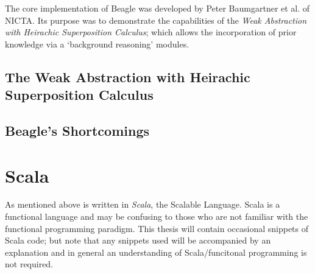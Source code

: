 The core implementation of Beagle was developed by Peter Baumgartner et al. of NICTA.
Its purpose was to demonstrate the capabilities of the \emph{Weak Abstraction with Heirachic Superposition Calculus};
which allows the incorporation of prior knowledge via a `background reasoning' modules.


\subsection{The Weak Abstraction with Heirachic Superposition Calculus}

\subsection{Beagle's Shortcomings}



\section{Scala}
\label{sec:scala}

As mentioned above \beagle is written in \emph{Scala}, the Scalable Language. Scala
is a functional language and may be confusing to those who are not familiar with the
functional programming paradigm. This thesis will contain occasional snippets of
Scala code; but note that any snippets used will be accompanied by an explanation
and in general an understanding of Scala/funcitonal programming is not required.


